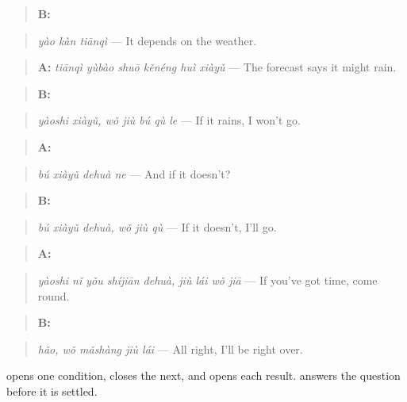 \begin{quote}
\textbf{B:} 
\end{quote}

\begin{quote}
\emph{yào kàn tiānqì} — It depends on the weather.
\end{quote}

\begin{quote}
\textbf{A:} \emph{tiānqì yùbào shuō kěnéng huì xiàyǔ} — The forecast says it might rain.
\end{quote}

\begin{quote}
\textbf{B:}  
\end{quote}

\begin{quote}
\emph{yàoshi xiàyǔ, wǒ jiù bú qù le} — If it rains, I won't go.
\end{quote}

\begin{quote}
\textbf{A:} 
\end{quote}

\begin{quote}
\emph{bú xiàyǔ dehuà ne} — And if it doesn't?
\end{quote}

\begin{quote}
\textbf{B:}  
\end{quote}

\begin{quote}
\emph{bú xiàyǔ dehuà, wǒ jiù qù} — If it doesn't, I'll go.
\end{quote}

\begin{quote}
\textbf{A:}  
\end{quote}

\begin{quote}
\emph{yàoshi nǐ yǒu shíjiān dehuà, jiù lái wǒ jiā} — If you've got time, come round.
\end{quote}

\begin{quote}
\textbf{B:}  
\end{quote}

\begin{quote}
\emph{hǎo, wǒ mǎshàng jiù lái} — All right, I'll be right over.
\end{quote}

 opens one condition,  closes the next, and  opens each result.  answers the question before it is settled.

